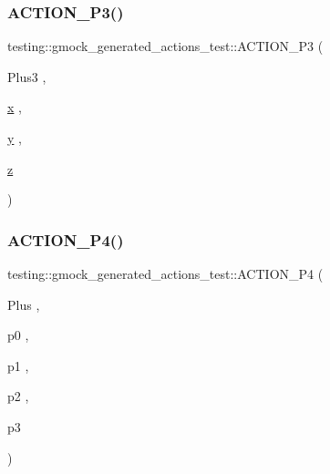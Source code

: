 \subsubsection{\texorpdfstring{ACTION\_P3()}{ACTION\_P3()}\hspace{0.1cm}{\footnotesize\ttfamily [3/3]}}
{\footnotesize\ttfamily testing\+::gmock\+\_\+generated\+\_\+actions\+\_\+test\+::\+A\+C\+T\+I\+O\+N\+\_\+\+P3 (\begin{DoxyParamCaption}\item[{Plus3}]{,  }\item[{\mbox{\hyperlink{_obj__test_2lib_2googletest-master_2googlemock_2test_2gmock-matchers__test_8cc_a6150e0515f7202e2fb518f7206ed97dc}{x}}}]{,  }\item[{\mbox{\hyperlink{_obj__test_2lib_2googletest-master_2googlemock_2test_2gmock-matchers__test_8cc_a39cb44155237f0205e0feb931d5acbed}{y}}}]{,  }\item[{\mbox{\hyperlink{_obj__test_2lib_2googletest-master_2googlemock_2test_2gmock-matchers__test_8cc_a196ff6a287f53f758b1506f21269fc77}{z}}}]{ }\end{DoxyParamCaption})}

\mbox{\label{namespacetesting_1_1gmock__generated__actions__test_ac86e9e1fa5be82823e80247ba093301c}} 
\subsubsection{\texorpdfstring{ACTION\_P4()}{ACTION\_P4()}}
{\footnotesize\ttfamily testing\+::gmock\+\_\+generated\+\_\+actions\+\_\+test\+::\+A\+C\+T\+I\+O\+N\+\_\+\+P4 (\begin{DoxyParamCaption}\item[{Plus}]{,  }\item[{p0}]{,  }\item[{p1}]{,  }\item[{p2}]{,  }\item[{p3}]{ }\end{DoxyParamCaption})}

\mbox{\label{namespacetesting_1_1gmock__generated__actions__test_a948863fb38d913f02a0c5bde6be0b0a0}} 
